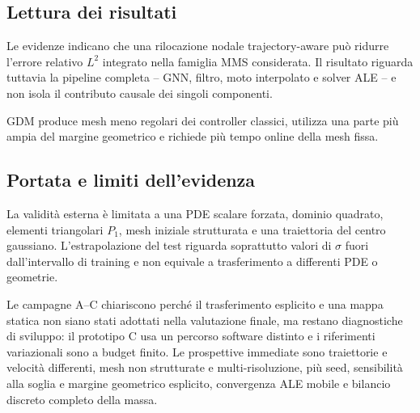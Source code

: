 \subsection{Lettura dei risultati}

Le evidenze indicano che una rilocazione nodale trajectory-aware può ridurre l'errore relativo $L^2$ integrato nella famiglia MMS considerata. Il risultato riguarda tuttavia la pipeline completa -- GNN, filtro, moto interpolato e solver ALE -- e non isola il contributo causale dei singoli componenti.

GDM produce mesh meno regolari dei controller classici, utilizza una parte più ampia del margine geometrico e richiede più tempo online della mesh fissa.

\subsection{Portata e limiti dell'evidenza}

La validità esterna è limitata a una PDE scalare forzata, dominio quadrato, elementi triangolari $P_1$, mesh iniziale strutturata e una traiettoria del centro gaussiano. L'estrapolazione del test riguarda soprattutto valori di $\sigma$ fuori dall'intervallo di training e non equivale a trasferimento a differenti PDE o geometrie.

Le campagne A--C chiariscono perché il trasferimento esplicito e una mappa statica non siano stati adottati nella valutazione finale, ma restano diagnostiche di sviluppo: il prototipo C usa un percorso software distinto e i riferimenti variazionali sono a budget finito. Le prospettive immediate sono traiettorie e velocità differenti, mesh non strutturate e multi-risoluzione, più seed, sensibilità alla soglia e margine geometrico esplicito, convergenza ALE mobile e bilancio discreto completo della massa.
